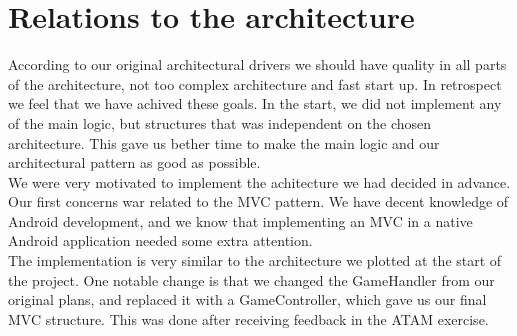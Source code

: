 \section{Relations to the architecture}

According to our original architectural drivers we should have quality in all parts of the architecture, not too complex architecture and fast start up. In retrospect we feel that we have achived these goals. In the start, we did not implement any of the main logic, but structures that was independent on the chosen architecture. This gave us bether time to make the main logic and our architectural pattern as good as possible.\\

We were very motivated to implement the achitecture we had decided in advance. Our first concerns war related to the MVC pattern. We have decent knowledge of Android development, and we know that implementing an MVC in a native Android application needed some extra attention. \\

The implementation is very similar to the architecture we plotted at the start of the project. One notable change is that we changed the GameHandler from our original plans, and replaced it with a GameController, which gave us our final MVC structure. This was done after receiving feedback in the ATAM exercise.

